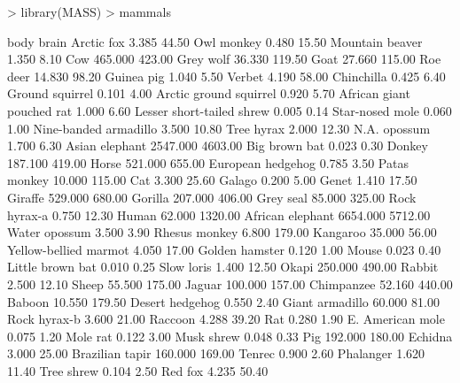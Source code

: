 \documentclass[onecolumn,12pt]{book}
\begin{document}
\begin{Schunk}
\begin{Sinput}
> library(MASS)
> mammals
\end{Sinput}
\begin{Soutput}
                              body   brain
Arctic fox                   3.385   44.50
Owl monkey                   0.480   15.50
Mountain beaver              1.350    8.10
Cow                        465.000  423.00
Grey wolf                   36.330  119.50
Goat                        27.660  115.00
Roe deer                    14.830   98.20
Guinea pig                   1.040    5.50
Verbet                       4.190   58.00
Chinchilla                   0.425    6.40
Ground squirrel              0.101    4.00
Arctic ground squirrel       0.920    5.70
African giant pouched rat    1.000    6.60
Lesser short-tailed shrew    0.005    0.14
Star-nosed mole              0.060    1.00
Nine-banded armadillo        3.500   10.80
Tree hyrax                   2.000   12.30
N.A. opossum                 1.700    6.30
Asian elephant            2547.000 4603.00
Big brown bat                0.023    0.30
Donkey                     187.100  419.00
Horse                      521.000  655.00
European hedgehog            0.785    3.50
Patas monkey                10.000  115.00
Cat                          3.300   25.60
Galago                       0.200    5.00
Genet                        1.410   17.50
Giraffe                    529.000  680.00
Gorilla                    207.000  406.00
Grey seal                   85.000  325.00
Rock hyrax-a                 0.750   12.30
Human                       62.000 1320.00
African elephant          6654.000 5712.00
Water opossum                3.500    3.90
Rhesus monkey                6.800  179.00
Kangaroo                    35.000   56.00
Yellow-bellied marmot        4.050   17.00
Golden hamster               0.120    1.00
Mouse                        0.023    0.40
Little brown bat             0.010    0.25
Slow loris                   1.400   12.50
Okapi                      250.000  490.00
Rabbit                       2.500   12.10
Sheep                       55.500  175.00
Jaguar                     100.000  157.00
Chimpanzee                  52.160  440.00
Baboon                      10.550  179.50
Desert hedgehog              0.550    2.40
Giant armadillo             60.000   81.00
Rock hyrax-b                 3.600   21.00
Raccoon                      4.288   39.20
Rat                          0.280    1.90
E. American mole             0.075    1.20
Mole rat                     0.122    3.00
Musk shrew                   0.048    0.33
Pig                        192.000  180.00
Echidna                      3.000   25.00
Brazilian tapir            160.000  169.00
Tenrec                       0.900    2.60
Phalanger                    1.620   11.40
Tree shrew                   0.104    2.50
Red fox                      4.235   50.40
\end{Soutput}
\end{Schunk}
\end{document}
